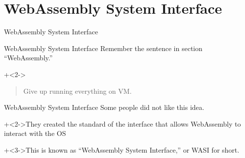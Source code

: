 %
%

\section{WebAssembly System Interface}


\begin{frame}{}{}
    {\Large WebAssembly System Interface}
\end{frame}


\begin{frame}{WebAssembly System Interface}{}
    Remember the sentence in section ``WebAssembly.''
    \vspace{4ex}

    \onslide+<2->{\begin{quote}Give up running everything on VM.\end{quote}}
\end{frame}


\begin{frame}{WebAssembly System Interface}{}
    Some people did not like this idea.
    \vspace{4ex}

    \onslide+<2->{They created the standard of the interface that allows WebAssembly to interact with the OS}
    \vspace{4ex}

    \onslide+<3->{This is known as ``WebAssembly System Interface,'' or WASI for short.}
\end{frame}


